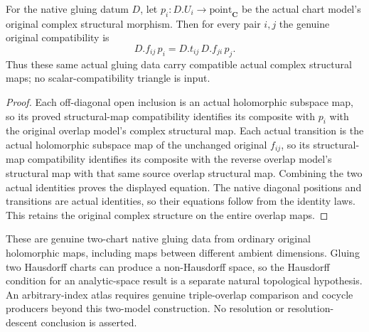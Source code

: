\begin{theorem}
\label{hir:actual-two-model-complex-structural-compatibility}
\leanok
For the native gluing datum $D$, let $p_i:D.U_i\to\mathrm{point}_{\mathbf C}$
be the actual chart model's original complex structural morphism. Then
for every pair $i,j$ the genuine original compatibility is
\[
 D.f_{ij}\,p_i=D.t_{ij}\,D.f_{ji}\,p_j.
\]
Thus these same actual gluing data carry compatible actual complex
structural maps; no scalar-compatibility triangle is input.
\end{theorem}
\begin{proof}
Each off-diagonal open inclusion is an actual holomorphic subspace map,
so its proved structural-map compatibility identifies its composite with
$p_i$ with the original overlap model's complex structural map. Each
actual transition is the actual holomorphic subspace map of the unchanged
original $f_{ij}$, so its structural-map compatibility identifies its
composite with the reverse overlap model's structural map with that same
source overlap structural map. Combining the two actual identities proves
the displayed equation. The native diagonal positions and transitions
are actual identities, so their equations follow from the identity laws.
This retains the original complex structure on the entire overlap maps.
\end{proof}

These are genuine two-chart native gluing data from ordinary original
holomorphic maps, including maps between different ambient dimensions.
Gluing two Hausdorff charts can produce a non-Hausdorff space, so the
Hausdorff condition for an analytic-space result is a separate natural
topological hypothesis. An arbitrary-index atlas requires genuine
triple-overlap comparison and cocycle producers beyond this two-model
construction. No resolution or resolution-descent conclusion is asserted.
